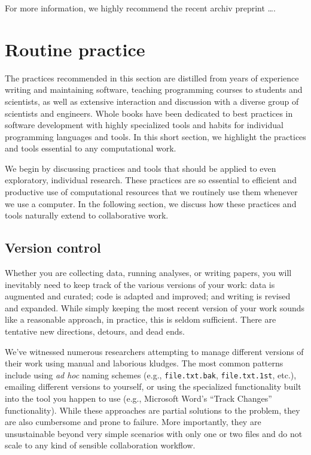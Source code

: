 \documentclass[ChapterTOCs,krantz2]{krantz} %
\theoremstyle{definition}
\begin{document}
For more information, we highly recommend the recent archiv preprint
\ldots \cite{2012arXiv1210.0530A}.

\section{\label{sec:practice}Routine practice}

The practices recommended in this section are distilled from years of
experience writing and maintaining software, teaching programming courses to
students and scientists, as well as extensive interaction and discussion with a
diverse group of scientists and engineers.  Whole books have been dedicated to
best practices in software development with highly specialized tools and habits
for individual programming languages and tools.  In this short section, we
highlight the practices and tools essential to any computational work.

We begin by discussing practices and tools that should be applied to even
exploratory, individual research.  These practices are so essential to
efficient and productive use of computational resources that we routinely use
them whenever we use a computer. In the following section, we discuss how these
practices and tools naturally extend to collaborative work. 

\subsection{Version control}

Whether you are collecting data, running analyses, or writing papers,
you will inevitably need to keep track of the various versions of your work:
data is augmented and curated; code is adapted and improved; and writing is
revised and expanded.  While simply keeping the most recent version of your
work sounds like a reasonable approach, in practice, this is seldom sufficient.
There are tentative new directions, detours, and dead ends.

We've witnessed numerous researchers attempting to manage different versions of
their work using manual and laborious kludges. The most common patterns include
using \emph{ad hoc} naming schemes (e.g., \texttt{file.txt.bak},
\texttt{file.txt.1st}, etc.), emailing different versions to yourself, or using
the specialized functionality built into the tool you happen to use (e.g.,
Microsoft Word's ``Track Changes'' functionality).  While these approaches are
partial solutions to the problem, they are also cumbersome and prone to
failure.  More importantly, they are unsustainable beyond very
simple scenarios with only one or two files and do not scale to any kind of
sensible collaboration workflow.
\end{document}
